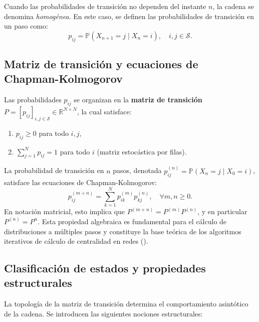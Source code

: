 \documentclass[
  spanish,
  us-letterpaper,
]{scrreprt}
\providecommand{\tightlist}{%
  \setlength{\itemsep}{0pt}\setlength{\parskip}{0pt}}
\numberwithin{equation}{section}
\begin{document}
Cuando las probabilidades de transición no dependen del instante \(n\),
la cadena se denomina \emph{homogénea}. En este caso, se definen las
probabilidades de transición en un paso como: \[
p_{ij} = \mathbb{P}(X_{n+1} = j \mid X_n = i), \quad i,j \in \mathcal{S}.
\]

\subsection{Matriz de transición y ecuaciones de
Chapman-Kolmogorov}\label{sec-transicion}

Las probabilidades \(p_{ij}\) se organizan en la \textbf{matriz de
transición}
\(P = [p_{ij}]_{i,j \in \mathcal{S}} \in \mathbb{R}^{N \times N}\), la
cual satisface:

\begin{enumerate}
\def\labelenumi{\arabic{enumi}.}
\tightlist
\item
  \(p_{ij} \geq 0\) para todo \(i,j\),
\item
  \(\sum_{j=1}^{N} p_{ij} = 1\) para todo \(i\) (matriz estocástica por
  filas).
\end{enumerate}

La probabilidad de transición en \(n\) pasos, denotada
\(p_{ij}^{(n)} = \mathbb{P}(X_n = j \mid X_0 = i)\), satisface las
ecuaciones de Chapman-Kolmogorov: \[
p_{ij}^{(m+n)} = \sum_{k=1}^{N} p_{ik}^{(m)} p_{kj}^{(n)}, \quad \forall m,n \geq 0.
\] En notación matricial, esto implica que
\(P^{(m+n)} = P^{(m)} P^{(n)}\), y en particular \(P^{(n)} = P^n\). Esta
propiedad algebraica es fundamental para el cálculo de distribuciones a
múltiples pasos y constituye la base teórica de los algoritmos
iterativos de cálculo de centralidad en redes
().

\subsection{Clasificación de estados y propiedades
estructurales}\label{clasificaciuxf3n-de-estados-y-propiedades-estructurales}

La topología de la matriz de transición determina el comportamiento
asintótico de la cadena. Se introducen las siguientes nociones
estructurales:
\end{document}
